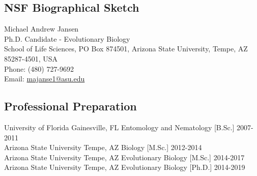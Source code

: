 \documentclass[11pt,a4paper]{extarticle}
\begin{document}
\subsection*{NSF Biographical Sketch}
	Michael Andrew Jansen
	\\
	Ph.D. Candidate - Evolutionary Biology
	\\
	School of Life Sciences, PO Box 874501, Arizona State University, Tempe, AZ 85287-4501, USA
	\\
	Phone: (480) 727-9692
	\\
	Email: \href{mailto:majanse1@asu.edu}{majanse1@asu.edu}
	
\subsection*{Professional Preparation}
	University of Florida \tabto*{2in} Gainesville, FL \tabto*{3.25in} Entomology and Nematology [B.Sc.] \tabto*{5.5in} 2007-2011
	\\
	Arizona State University \tabto*{2in} Tempe, AZ \tabto*{3.25in} Biology [M.Sc.] \tabto*{5.5in} 2012-2014
	\\
	Arizona State University \tabto*{2in} Tempe, AZ \tabto*{3.25in} Evolutionary Biology [M.Sc.] \tabto*{5.5in} 2014-2017
	\\
	Arizona State University \tabto*{2in} Tempe, AZ \tabto*{3.25in} Evolutionary Biology [Ph.D.] \tabto*{5.5in} 2014-2019
\end{document}
